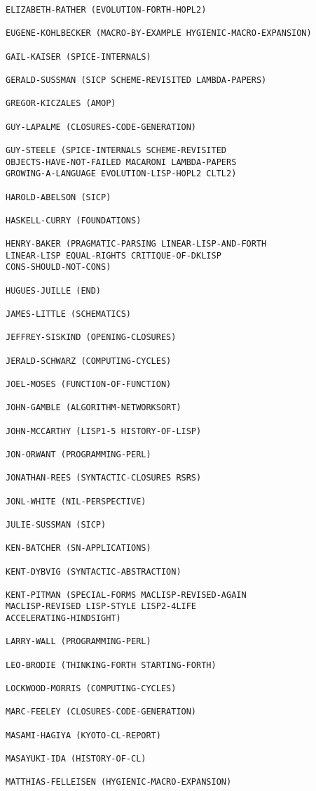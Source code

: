 \begin{verbatim}
ELIZABETH-RATHER (EVOLUTION-FORTH-HOPL2)

EUGENE-KOHLBECKER (MACRO-BY-EXAMPLE HYGIENIC-MACRO-EXPANSION)

GAIL-KAISER (SPICE-INTERNALS)

GERALD-SUSSMAN (SICP SCHEME-REVISITED LAMBDA-PAPERS)

GREGOR-KICZALES (AMOP)

GUY-LAPALME (CLOSURES-CODE-GENERATION)

GUY-STEELE (SPICE-INTERNALS SCHEME-REVISITED
OBJECTS-HAVE-NOT-FAILED MACARONI LAMBDA-PAPERS
GROWING-A-LANGUAGE EVOLUTION-LISP-HOPL2 CLTL2)

HAROLD-ABELSON (SICP)

HASKELL-CURRY (FOUNDATIONS)

HENRY-BAKER (PRAGMATIC-PARSING LINEAR-LISP-AND-FORTH
LINEAR-LISP EQUAL-RIGHTS CRITIQUE-OF-DKLISP
CONS-SHOULD-NOT-CONS)

HUGUES-JUILLE (END)

JAMES-LITTLE (SCHEMATICS)

JEFFREY-SISKIND (OPENING-CLOSURES)

JERALD-SCHWARZ (COMPUTING-CYCLES)

JOEL-MOSES (FUNCTION-OF-FUNCTION)

JOHN-GAMBLE (ALGORITHM-NETWORKSORT)

JOHN-MCCARTHY (LISP1-5 HISTORY-OF-LISP)

JON-ORWANT (PROGRAMMING-PERL)

JONATHAN-REES (SYNTACTIC-CLOSURES RSRS)

JONL-WHITE (NIL-PERSPECTIVE)

JULIE-SUSSMAN (SICP)

KEN-BATCHER (SN-APPLICATIONS)

KENT-DYBVIG (SYNTACTIC-ABSTRACTION)

KENT-PITMAN (SPECIAL-FORMS MACLISP-REVISED-AGAIN
MACLISP-REVISED LISP-STYLE LISP2-4LIFE
ACCELERATING-HINDSIGHT)

LARRY-WALL (PROGRAMMING-PERL)

LEO-BRODIE (THINKING-FORTH STARTING-FORTH)

LOCKWOOD-MORRIS (COMPUTING-CYCLES)

MARC-FEELEY (CLOSURES-CODE-GENERATION)

MASAMI-HAGIYA (KYOTO-CL-REPORT)

MASAYUKI-IDA (HISTORY-OF-CL)

MATTHIAS-FELLEISEN (HYGIENIC-MACRO-EXPANSION)


\end{verbatim}
